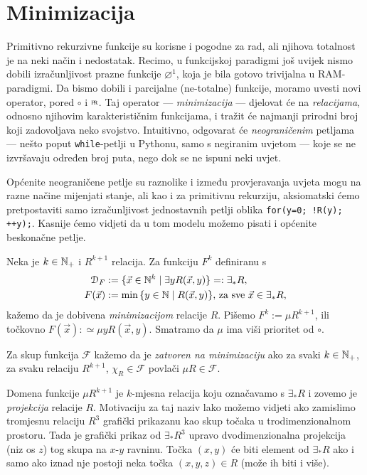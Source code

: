 \section{Minimizacija}

Primitivno rekurzivne funkcije su korisne i pogodne za rad, ali njihova totalnost je na neki način i nedostatak. Recimo, u funkcijskoj paradigmi još uvijek nismo dobili izračunljivost prazne funkcije $\varnothing^1$, koja je bila gotovo trivijalna u RAM-paradigmi. Da bismo dobili i parcijalne (ne-totalne) funkcije, moramo uvesti novi operator, pored $\circ$ i $\pr$. Taj operator --- \emph{minimizacija} --- djelovat će na \emph{relacijama}, odnosno njihovim karakterističnim funkcijama, i tražit će najmanji prirodni broj koji zadovoljava neko svojstvo. Intuitivno, odgovarat će \emph{neograničenim} petljama --- nešto poput \texttt{while}-petlji u Pythonu, samo s negiranim uvjetom --- koje se ne izvršavaju određen broj puta, nego dok se ne ispuni neki uvjet.

Općenite neograničene petlje su raznolike i između provjeravanja uvjeta mogu na razne načine mijenjati stanje, ali kao i za primitivnu rekurziju, aksiomatski ćemo pretpostaviti samo izračunljivost jednostavnih petlji oblika
\texttt{for(y=0; !R(y); ++y);}.
Kasnije ćemo vidjeti da u tom modelu možemo pisati i općenite beskonačne petlje.

\begin{definicija}
Neka je $k\in{\mathbb N}_+$ i $R^{k+1}$ relacija. Za funkciju $F^k$ definiranu s
\begin{align}
    \label{eq:dommu}\mathcal D_{F}&:=\{\vec x\in{\mathbb N}^k\mid\exists yR(\vec x,y)\}=:\exists_*R\text,\\
    F(\vec x)&:=\min\,\{y\in{\mathbb N}\mid R(\vec x,y)\}\text{, za sve $\vec x\in\exists_* R$,}
\end{align}
kažemo da je dobivena \emph{minimizacijom} relacije $R$. Pišemo $F^k:=\mu R^{k+1}$, ili točkovno
$F(\vec x):\simeq\mu yR(\vec x,y)$. Smatramo da $\mu$ ima viši prioritet od $\circ$.

Za skup funkcija $\mathcal F$ kažemo da je \emph{zatvoren na minimizaciju} ako za svaki $k\in{\mathbb N}_+$, za svaku relaciju $R^{k+1}$, $\chi_R\in\mathcal F$ povlači $\mu R\in\mathcal F$. 
\end{definicija}

Domena funkcije $\mu R^{k+1}$ je $k$-mjesna relacija koju označavamo s $\exists_*R$ i zovemo je \emph{projekcija} relacije $R$. Motivaciju za taj naziv lako možemo vidjeti ako zamislimo tromjesnu relaciju $R^3$ grafički prikazanu kao skup točaka u trodimenzionalnom prostoru. Tada je grafički prikaz od $\exists_*R^3$ upravo dvodimenzionalna projekcija (niz os $z$) tog skupa na $x$-$y$ ravninu. Točka $(x,y)$ će biti element od $\exists_*R$ ako i samo ako iznad nje postoji neka točka $(x,y,z)\in R$ (može ih biti i više).

